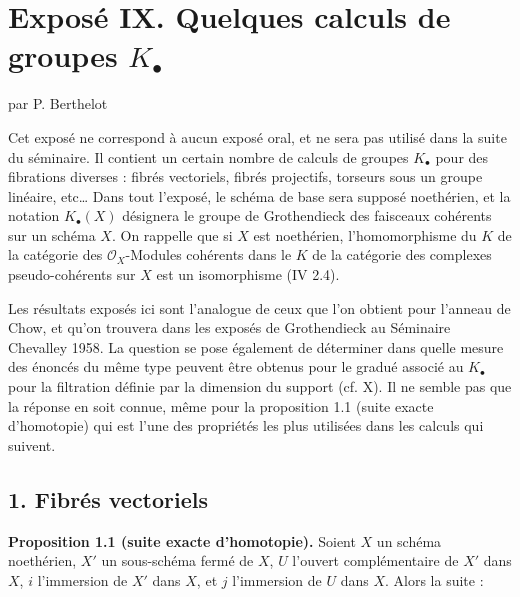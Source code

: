 \section*{Exposé IX. Quelques calculs de groupes $K_\bullet$}
\begin{center}
par P. Berthelot
\end{center}

Cet exposé ne correspond à aucun exposé oral, et ne sera pas utilisé dans la suite du séminaire. Il contient un certain nombre de calculs de groupes $K_\bullet$ pour des fibrations diverses : fibrés vectoriels, fibrés projectifs, torseurs sous un groupe linéaire, etc\ldots{} Dans tout l'exposé, le schéma de base sera supposé noethérien, et la notation $K_\bullet(X)$ désignera le groupe de Grothendieck des faisceaux cohérents sur un schéma $X$. On rappelle que si $X$ est noethérien, l'homomorphisme du $K$ de la catégorie des $\mathcal O_X$-Modules cohérents dans le $K$ de la catégorie des complexes pseudo-cohérents sur $X$ est un isomorphisme (IV 2.4).

Les résultats exposés ici sont l'analogue de ceux que l'on obtient pour l'anneau de Chow, et qu'on trouvera dans les exposés de Grothendieck au Séminaire Chevalley 1958. La question se pose également de déterminer dans quelle mesure des énoncés du même type peuvent être obtenus pour le gradué associé au $K_\bullet$ pour la filtration définie par la dimension du support (cf. X). Il ne semble pas que la réponse en soit connue, même pour la proposition 1.1 (suite exacte d'homotopie) qui est l'une des propriétés les plus utilisées dans les calculs qui suivent.

\subsection*{1. Fibrés vectoriels}

\textbf{Proposition 1.1 (suite exacte d'homotopie).} Soient $X$ un schéma noethérien, $X'$ un sous-schéma fermé de $X$, $U$ l'ouvert complémentaire de $X'$ dans $X$, $i$ l'immersion de $X'$ dans $X$, et $j$ l'immersion de $U$ dans $X$. Alors la suite :
